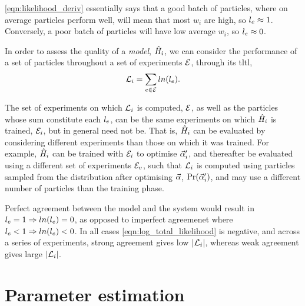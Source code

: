 \cref{eqn:likelihood_deriv} essentially says that a good batch of \glspl{particle}, 
    where on average \glspl{particle} perform well, 
    will mean that most $w_i$ are high, so $l_{e} \approx 1$. 
Conversely, a poor batch of \glspl{particle} will have low average $w_i$, so $l_{e} \approx 0$. 
\par

In order to assess the quality of a \emph{model}, $\hat{H}_i$, 
    we can consider the performance of a set of \glspl{particle} throughout a set of experiments ${ \mathcal{E} }$, 
    through its \gls{tltl}, 
\begin{equation}
    \label{eqn:log_total_likelihood}
    {\mathcal{L}}_{i} = \sum\limits_{e \in { \mathcal{E} }} ln(l_{e}).    
\end{equation}

The set of experiments on which ${\mathcal{L}}_{i}$ is computed, ${ \mathcal{E} }$, 
    as well as the \glspl{particle} whose sum constitute each $l_{e}$,
    can be the same experiments on which $\hat{H}_i$ is trained, ${ \mathcal{E} }_i$, but in general need not be.
That is, $\hat{H}_i$ can be evaluated by considering different experiments than those on which it was trained.
For example, $\hat{H}_i$ can be trained with ${ \mathcal{E} }_i$ to optimise $\vec{\alpha}_i^{\prime}$, 
    and thereafter be evaluated using a different set of experiments ${ \mathcal{E} }_v$, 
    such that ${\mathcal{L}}_{i}$ is computed using \glspl{particle} sampled from the distribution after optimising $\vec{\alpha}$, 
    $\Pr(\vec{\alpha}_i^{\prime})$, and may use a different number of \glspl{particle} than the training phase. 
\par 

Perfect agreement between the model and the system would result in $l_{e}=1 \Rightarrow ln(l_{e})=0$, 
    as opposed to imperfect agreemenet where $l_{e} < 1 \Rightarrow ln(l_{e}) < 0$.
In all cases \cref{eqn:log_total_likelihood} is negative, 
    and across a series of experiments,
    strong agreement gives low $\lvert {\mathcal{L}}_{i} \rvert $, 
    whereas weak agreement gives large $\lvert {\mathcal{L}}_{i} \rvert $. 


\section{Parameter estimation}

